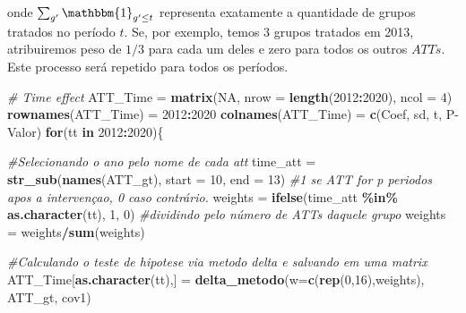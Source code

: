 \documentclass[portugues]{article}
\newenvironment{Shaded}{\begin{snugshade}}{\end{snugshade}}
\newcommand{\AttributeTok}[1]{\textcolor[rgb]{0.13,0.29,0.53}{#1}}
\newcommand{\CommentTok}[1]{\textcolor[rgb]{0.56,0.35,0.01}{\textit{#1}}}
\newcommand{\ConstantTok}[1]{\textcolor[rgb]{0.56,0.35,0.01}{#1}}
\newcommand{\ControlFlowTok}[1]{\textcolor[rgb]{0.13,0.29,0.53}{\textbf{#1}}}
\newcommand{\DecValTok}[1]{\textcolor[rgb]{0.00,0.00,0.81}{#1}}
\newcommand{\FunctionTok}[1]{\textcolor[rgb]{0.13,0.29,0.53}{\textbf{#1}}}
\newcommand{\NormalTok}[1]{#1}
\newcommand{\OtherTok}[1]{\textcolor[rgb]{0.56,0.35,0.01}{#1}}
\newcommand{\SpecialCharTok}[1]{\textcolor[rgb]{0.81,0.36,0.00}{\textbf{#1}}}
\newcommand{\StringTok}[1]{\textcolor[rgb]{0.31,0.60,0.02}{#1}}
\begin{document}
\noindent onde $\sum_{g'} \mathbbm{1}_{g' \leq t}$ representa exatamente a quantidade de grupos tratados no período $t$. Se, por exemplo, temos 3 grupos tratados em 2013, atribuiremos peso de $1/3$ para cada um deles e zero para todos os outros $ATTs$. Este processo será repetido para todos os períodos.


\begin{box_code}

\begin{Shaded}
\begin{Highlighting}[]
\CommentTok{\# Time effect}
\NormalTok{ATT\_Time }\OtherTok{=} \FunctionTok{matrix}\NormalTok{(}\ConstantTok{NA}\NormalTok{, }\AttributeTok{nrow =} \FunctionTok{length}\NormalTok{(}\DecValTok{2012}\SpecialCharTok{:}\DecValTok{2020}\NormalTok{), }\AttributeTok{ncol =} \DecValTok{4}\NormalTok{)}
\FunctionTok{rownames}\NormalTok{(ATT\_Time) }\OtherTok{=} \DecValTok{2012}\SpecialCharTok{:}\DecValTok{2020}
\FunctionTok{colnames}\NormalTok{(ATT\_Time) }\OtherTok{=} \FunctionTok{c}\NormalTok{(}\StringTok{\textquotesingle{}Coef\textquotesingle{}}\NormalTok{, }\StringTok{\textquotesingle{}sd\textquotesingle{}}\NormalTok{, }\StringTok{\textquotesingle{}t\textquotesingle{}}\NormalTok{, }\StringTok{\textquotesingle{}P{-}Valor\textquotesingle{}}\NormalTok{)}
\ControlFlowTok{for}\NormalTok{(tt }\ControlFlowTok{in} \DecValTok{2012}\SpecialCharTok{:}\DecValTok{2020}\NormalTok{)\{}
  
\CommentTok{\#Selecionando o ano pelo nome de cada att}
\NormalTok{time\_att }\OtherTok{=} \FunctionTok{str\_sub}\NormalTok{(}\FunctionTok{names}\NormalTok{(ATT\_gt), }\AttributeTok{start =} \DecValTok{10}\NormalTok{, }\AttributeTok{end =} \DecValTok{13}\NormalTok{)}
\CommentTok{\#1 se ATT for p periodos apos a intervençao, 0 caso }
\CommentTok{contrário.}
\NormalTok{weights }\OtherTok{=} \FunctionTok{ifelse}\NormalTok{(time\_att }\SpecialCharTok{\%in\%} \FunctionTok{as.character}\NormalTok{(tt), }\DecValTok{1}\NormalTok{, }\DecValTok{0}\NormalTok{)}
\CommentTok{\#dividindo pelo número de ATTs daquele grupo}
\NormalTok{weights }\OtherTok{=}\NormalTok{ weights}\SpecialCharTok{/}\FunctionTok{sum}\NormalTok{(weights)}

\end{Highlighting}
\end{Shaded}

\begin{Shaded}
\begin{Highlighting}[]
\CommentTok{\#Calculando o teste de hipotese via metodo delta e salvando }
\CommentTok{em uma matrix}
\NormalTok{  ATT\_Time[}\FunctionTok{as.character}\NormalTok{(tt),] }\OtherTok{=} \FunctionTok{delta\_metodo}\NormalTok{(}\AttributeTok{w=}\FunctionTok{c}\NormalTok{(}\FunctionTok{rep}\NormalTok{(}\DecValTok{0}\NormalTok{,}\DecValTok{16}\NormalTok{),weights),}
\NormalTok{\hspace{10mm} ATT\_gt, cov1)}
  

\end{Highlighting}
\end{Shaded}
\end{box_code}
\end{document}
